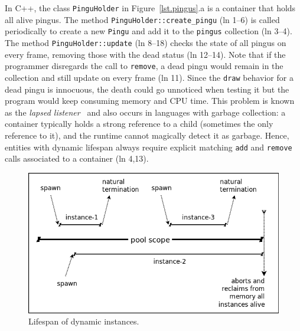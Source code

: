 \documentclass[times,twocolumn,final]{elsarticle}
\newcommand{\code}[1] {{\small{\texttt{#1}}}}
\begin{document}
In C++, the class \code{PinguHolder} in Figure~\ref{lst.pingus}.a is a
container that holds all alive pingus.
%
The method \code{PinguHolder::create\_pingu} (ln 1--6) is called periodically
to create a new \code{Pingu} and add it to the \code{pingus} collection
(ln 3--4).
The method \code{PinguHolder::update} (ln 8--18) checks the state of all
pingus on every frame, removing those with the dead status (ln 12--14).
%
Note that if the programmer disregards the call to \code{remove}, a dead pingu
would remain in the collection and still update on every frame (ln 11).
Since the \code{draw} behavior for a dead pingu is innocuous, the death could
go unnoticed when testing it but the program would keep consuming memory and
CPU time.
%
This problem is known as the \emph{lapsed listener}~\cite{games.patterns} and
also occurs in languages with garbage collection:
a container typically holds a strong reference to a child (sometimes the only 
reference to it), and the runtime cannot magically detect it as garbage.
%
Hence, entities with dynamic lifespan always require explicit matching
\code{add} and \code{remove} calls associated to a container (ln 4,13).

\begin{figure}
\centering
\includegraphics[width=\columnwidth]{pool}
\caption{Lifespan of dynamic instances.
\label{fig.pool}
}
\end{figure}
\end{document}

